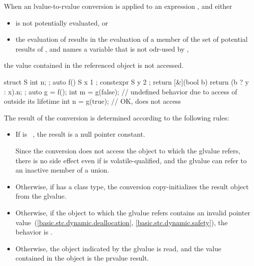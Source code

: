 \pnum
When an lvalue-to-rvalue conversion
is applied to an expression , and either
\begin{itemize}
\item {} is not potentially evaluated, or
\item the evaluation of  results in the evaluation of a member
       of the set of potential results of , and 
      names a variable  that is not odr-used by
      ,
\end{itemize}
the value contained in the referenced object is not accessed.
\begin{example}
\begin{codeblock}
struct S { int n; };
auto f() {
  S x { 1 };
  constexpr S y { 2 };
  return [&](bool b) { return (b ? y : x).n; };
}
auto g = f();
int m = g(false);   // undefined behavior due to access of  outside its lifetime
int n = g(true);    // OK, does not access 
\end{codeblock}
\end{example}

\pnum
The result of the conversion is determined according to the
following rules:

\begin{itemize}

\item If  is \cv{}~, the result is a
null pointer constant.
\begin{note}
Since the conversion does not access the object to which the glvalue refers,
there is no side effect even if  is volatile-qualified, and
the glvalue can refer to an inactive member of a union.
\end{note}

\item Otherwise, if  has a class
type, the conversion copy-initializes the result object from
the glvalue.

\item Otherwise, if the object to which the glvalue refers contains an invalid
pointer value~(\ref{basic.stc.dynamic.deallocation},
\ref{basic.stc.dynamic.safety}), the behavior is
.

\item Otherwise, the object indicated by the glvalue is read,
and the value contained in the object is the prvalue result.
\end{itemize}

